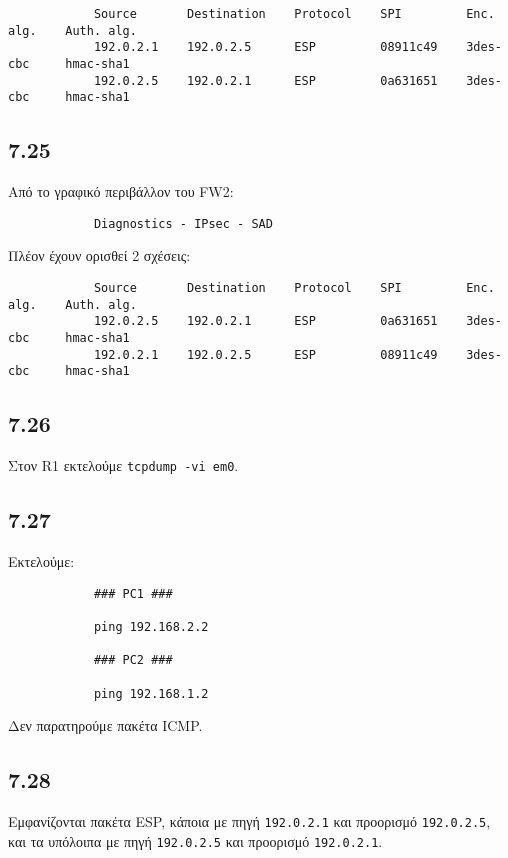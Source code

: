 \documentclass[a4paper, 12pt]{article}
\begin{document}
		\begin{verbatim}
			Source       Destination    Protocol    SPI         Enc. alg.    Auth. alg.
			192.0.2.1    192.0.2.5      ESP         08911c49    3des-cbc     hmac-sha1
			192.0.2.5    192.0.2.1      ESP         0a631651    3des-cbc     hmac-sha1
		\end{verbatim}

	\subsection*{7.25}
		Από το γραφικό περιβάλλον του FW2:
		
		\begin{verbatim}
			Diagnostics - IPsec - SAD
		\end{verbatim}

		Πλέον έχουν ορισθεί 2 σχέσεις:
		
		\begin{verbatim}
			Source       Destination    Protocol    SPI         Enc. alg.    Auth. alg.
			192.0.2.5    192.0.2.1      ESP         0a631651    3des-cbc     hmac-sha1
			192.0.2.1    192.0.2.5      ESP         08911c49    3des-cbc     hmac-sha1
		\end{verbatim}

	\subsection*{7.26}
		Στον R1 εκτελούμε \verb|tcpdump -vi em0|.

	\subsection*{7.27}
		Εκτελούμε:
		
		\begin{verbatim}
			### PC1 ###
			
			ping 192.168.2.2 
			
			### PC2 ###
			
			ping 192.168.1.2
		\end{verbatim}
		
		Δεν παρατηρούμε πακέτα ICMP.

	\subsection*{7.28}
		Εμφανίζονται πακέτα ESP, κάποια με πηγή \verb|192.0.2.1| και προορισμό \verb|192.0.2.5|, και τα υπόλοιπα με πηγή \verb|192.0.2.5| και προορισμό \verb|192.0.2.1|. 
\end{document}
